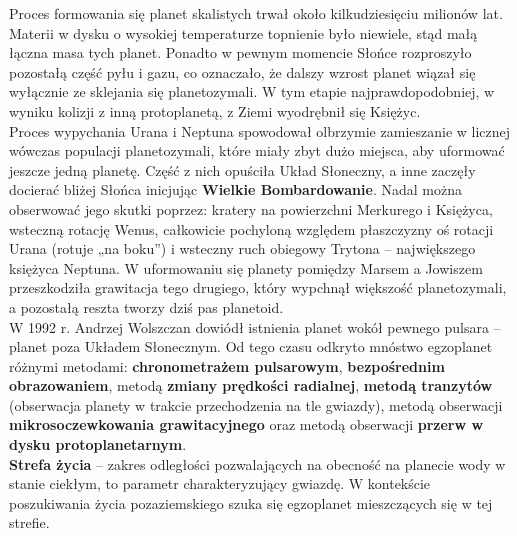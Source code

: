 \documentclass[../index.tex]{subfiles}
\begin{document}
        Proces formowania się planet skalistych trwał około kilkudziesięciu milionów lat. Materii w dysku o wysokiej temperaturze topnienie było niewiele, stąd małą łączna masa tych planet. Ponadto w pewnym momencie Słońce rozproszyło pozostałą część pyłu i gazu, co oznaczało, że dalszy wzrost planet wiązał się wyłącznie ze sklejania się planetozymali. W tym etapie najprawdopodobniej, w wyniku kolizji z inną protoplanetą, z Ziemi wyodrębnił się Księżyc.\\
        Proces wypychania Urana i Neptuna spowodował olbrzymie zamieszanie w licznej wówczas populacji planetozymali, które miały zbyt dużo miejsca, aby uformować jeszcze jedną planetę. Część z nich opuściła Układ Słoneczny, a inne zaczęły docierać bliżej Słońca inicjując \textbf{Wielkie Bombardowanie}. Nadal można obserwować jego skutki poprzez: kratery na powierzchni Merkurego i Księżyca, wsteczną rotację Wenus, całkowicie pochyloną względem płaszczyzny oś rotacji Urana (rotuje „na boku”) i wsteczny ruch obiegowy Trytona – największego księżyca Neptuna. W uformowaniu się planety pomiędzy Marsem a Jowiszem przeszkodziła grawitacja tego drugiego, który wypchnął większość planetozymali, a pozostałą reszta tworzy dziś pas planetoid.\\
        W 1992 r. Andrzej Wolszczan dowiódł istnienia planet wokół pewnego pulsara – planet poza Układem Słonecznym. Od tego czasu odkryto mnóstwo egzoplanet różnymi metodami: \textbf{chronometrażem pulsarowym}, \textbf{bezpośrednim obrazowaniem}, metodą \textbf{zmiany prędkości radialnej}, \textbf{metodą tranzytów} (obserwacja planety w trakcie przechodzenia na tle gwiazdy), metodą obserwacji \textbf{mikrosoczewkowania grawitacyjnego} oraz metodą obserwacji \textbf{przerw w dysku protoplanetarnym}.\\
        \textbf{Strefa życia} – zakres odległości pozwalających na obecność na planecie wody w stanie ciekłym, to parametr charakteryzujący gwiazdę. W kontekście poszukiwania życia pozaziemskiego szuka się egzoplanet mieszczących się w tej strefie.
\end{document}

